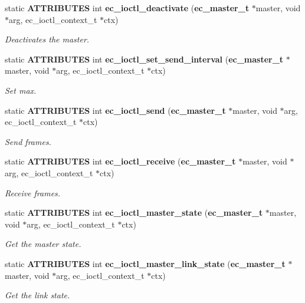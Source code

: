 \begin{DoxyCompactItemize}
static {\bf \-A\-T\-T\-R\-I\-B\-U\-T\-E\-S} int {\bf ec\-\_\-ioctl\-\_\-deactivate} ({\bf ec\-\_\-master\-\_\-t} $\ast$master, void $\ast$arg, ec\-\_\-ioctl\-\_\-context\-\_\-t $\ast$ctx)
\begin{DoxyCompactList}\small\item\em \-Deactivates the master. \end{DoxyCompactList}\item 
static {\bf \-A\-T\-T\-R\-I\-B\-U\-T\-E\-S} int {\bf ec\-\_\-ioctl\-\_\-set\-\_\-send\-\_\-interval} ({\bf ec\-\_\-master\-\_\-t} $\ast$master, void $\ast$arg, ec\-\_\-ioctl\-\_\-context\-\_\-t $\ast$ctx)
\begin{DoxyCompactList}\small\item\em \-Set max. \end{DoxyCompactList}\item 
static {\bf \-A\-T\-T\-R\-I\-B\-U\-T\-E\-S} int {\bf ec\-\_\-ioctl\-\_\-send} ({\bf ec\-\_\-master\-\_\-t} $\ast$master, void $\ast$arg, ec\-\_\-ioctl\-\_\-context\-\_\-t $\ast$ctx)
\begin{DoxyCompactList}\small\item\em \-Send frames. \end{DoxyCompactList}\item 
static {\bf \-A\-T\-T\-R\-I\-B\-U\-T\-E\-S} int {\bf ec\-\_\-ioctl\-\_\-receive} ({\bf ec\-\_\-master\-\_\-t} $\ast$master, void $\ast$arg, ec\-\_\-ioctl\-\_\-context\-\_\-t $\ast$ctx)
\begin{DoxyCompactList}\small\item\em \-Receive frames. \end{DoxyCompactList}\item 
static {\bf \-A\-T\-T\-R\-I\-B\-U\-T\-E\-S} int {\bf ec\-\_\-ioctl\-\_\-master\-\_\-state} ({\bf ec\-\_\-master\-\_\-t} $\ast$master, void $\ast$arg, ec\-\_\-ioctl\-\_\-context\-\_\-t $\ast$ctx)
\begin{DoxyCompactList}\small\item\em \-Get the master state. \end{DoxyCompactList}\item 
static {\bf \-A\-T\-T\-R\-I\-B\-U\-T\-E\-S} int {\bf ec\-\_\-ioctl\-\_\-master\-\_\-link\-\_\-state} ({\bf ec\-\_\-master\-\_\-t} $\ast$master, void $\ast$arg, ec\-\_\-ioctl\-\_\-context\-\_\-t $\ast$ctx)
\begin{DoxyCompactList}\small\item\em \-Get the link state. \end{DoxyCompactList}\item 

\end{DoxyCompactItemize}
